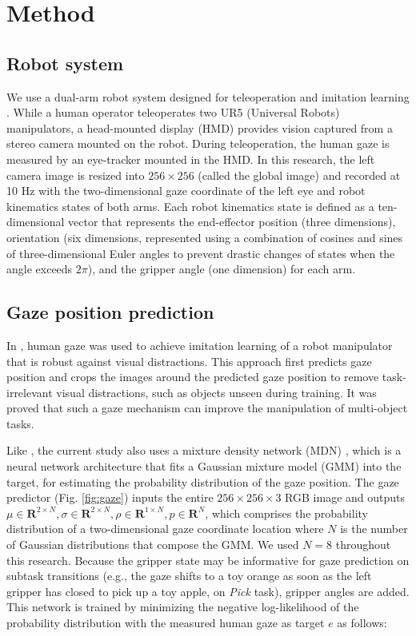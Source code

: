 \documentclass[letterpaper, 10 pt, conference]{ieeeconf}  %
\renewcommand\hl[1]{#1} %
\begin{document}
\section{Method}

\subsection{Robot system}
We use a dual-arm robot system designed for teleoperation and imitation learning \cite{kim2021gaze,kim2020using}. While a human operator teleoperates two UR5 (Universal Robots) manipulators, a head-mounted display (HMD) provides vision captured from a stereo camera mounted on the robot. During teleoperation, the human gaze is measured by an eye-tracker mounted in the HMD.
In this research, the left camera image is resized into $256 \times 256$ (called the global image) and recorded at 10 Hz with the two-dimensional gaze coordinate of the left eye and robot kinematics states of both arms. Each robot kinematics state is defined as a ten-dimensional vector that represents the end-effector position (three dimensions), orientation (six dimensions, represented using a combination of cosines and sines of three-dimensional Euler angles to prevent drastic changes of states when the angle exceeds $2 \pi$), and the gripper angle (one dimension) for each arm. 

\subsection{Gaze position prediction} \label{section:gaze}
In \cite{kim2020using}, human gaze was used to achieve imitation learning of a robot manipulator that is robust against visual distractions. This approach first predicts gaze position and crops the images around the predicted gaze position to remove task-irrelevant visual distractions, such as objects unseen during training. It was proved that such a gaze mechanism can improve the manipulation of multi-object tasks.

Like \cite{kim2020using}, the current study also uses a mixture density network (MDN) \cite{bishop1994mixture}, which is a neural network architecture that fits a Gaussian mixture model (GMM) into the target, for estimating the probability distribution of the gaze position. The gaze predictor (Fig. \ref{fig:gaze}) \hl{inputs the entire $256 \times 256 \times 3$ RGB image and outputs $\mu \in \mathbf{R}^{2\times N}, \sigma \in \mathbf{R}^{2 \times N}, \rho \in \mathbf{R}^{1 \times N}, p \in \mathbf{R}^N$}, \hl{which comprises the probability distribution of a two-dimensional gaze coordinate location where $N$ is the number of Gaussian distributions that compose the GMM. We used $N=8$ throughout this research.}
Because the gripper state may be informative for gaze prediction on subtask transitions (e.g., the gaze shifts to a toy orange as soon as the left gripper has closed to pick up a toy apple, on \textit{Pick} task), gripper angles are added. 
This network is trained by minimizing the negative log-likelihood of the probability distribution with the measured human gaze as target $e$ \hl{as follows}:
\end{document}
